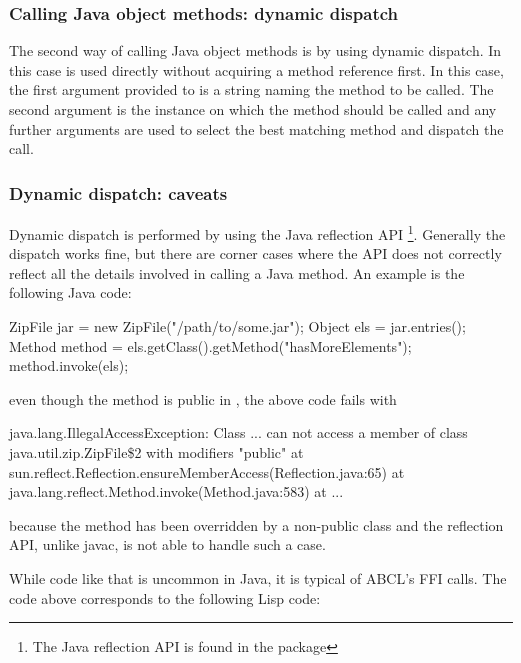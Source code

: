 \documentclass[10pt]{book}
\begin{document}
\subsubsection{Calling Java object methods: dynamic dispatch}

The second way of calling Java object methods is by using dynamic dispatch.
In this case  is used directly without acquiring a method
reference first. In this case, the first argument provided to 
is a string naming the method to be called. The second argument is the instance
on which the method should be called and any further arguments are used to
select the best matching method and dispatch the call.

\subsubsection{Dynamic dispatch: caveats}

Dynamic dispatch is performed by using the Java reflection
API \footnote{The Java reflection API is found in the
   package}. Generally the dispatch works
fine, but there are corner cases where the API does not correctly
reflect all the details involved in calling a Java method. An example
is the following Java code:

\begin{listing-java}
ZipFile jar = new ZipFile("/path/to/some.jar");
Object els = jar.entries();
Method method = els.getClass().getMethod("hasMoreElements");
method.invoke(els);
\end{listing-java}

even though the method  is public in ,
the above code fails with

\begin{listing-java}
java.lang.IllegalAccessException: Class ... can
not access a member of class java.util.zip.ZipFile\$2 with modifiers
"public"
       at sun.reflect.Reflection.ensureMemberAccess(Reflection.java:65)
       at java.lang.reflect.Method.invoke(Method.java:583)
       at ...
\end{listing-java}

because the method has been overridden by a non-public class and the
reflection API, unlike javac, is not able to handle such a case.

While code like that is uncommon in Java, it is typical of ABCL's FFI
calls. The code above corresponds to the following Lisp code:
\end{document}
